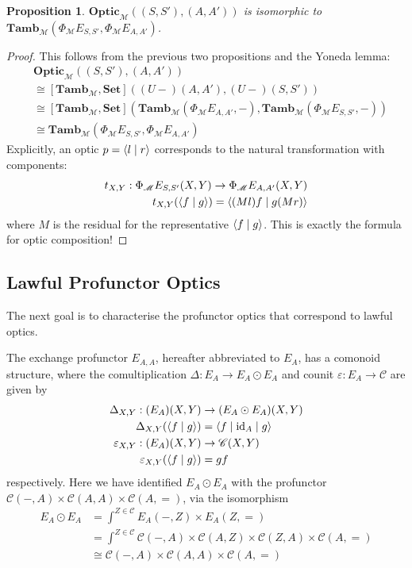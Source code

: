 \documentclass[11pt,letterpaper]{article}
\theoremstyle{plain}
\newtheorem{proposition}[theorem]{Proposition}
\theoremstyle{definition}
\newcommand{\C}{\mathscr{C}}
\newcommand{\M}{\mathscr{M}}
\newcommand{\Pastro}{\Phi}
\newcommand{\Set}{\mathbf{Set}}
\newcommand{\Tamb}{\mathbf{Tamb}}
\newcommand{\Optic}{\mathbf{Optic}}
\newcommand{\id}{\mathrm{id}}
\newcommand{\rep}[2]{{\ensuremath \left\langle #1 \mid #2 \right\rangle}}
\newcommand{\repthree}[3]{{\ensuremath \langle #1 \mid #2 \mid #3 \rangle}}
\begin{document}
\begin{proposition}
  $\Optic_\M((S, S'), (A, A'))$ is isomorphic to $\Tamb_\M(\Pastro_\M E_{S, S'}, \Pastro_\M E_{A, A'})$.
\end{proposition}
\begin{proof}
This follows from the previous two propositions and the Yoneda lemma:
\begin{align*}
  &\Optic_\M((S, S'), (A, A')) \\
  &\cong [\Tamb_\M, \Set]((U-)(A,A'),(U-)(S,S')) \\
  &\cong [\Tamb_\M, \Set](\Tamb_\M(\Pastro_\M E_{A, A'}, -),\Tamb_\M(\Pastro_\M E_{S, S'}, -)) \\
    &\cong \Tamb_\M(\Pastro_\M E_{S, S'}, \Pastro_\M E_{A, A'})
\end{align*}
Explicitly, an optic $p = \rep{l}{r}$ corresponds to the natural transformation with components:
\begin{align*}
t_{X, Y} : \Pastro_\M E_{S, S'}(X, Y) \to \Pastro_\M E_{A, A'}(X, Y) \\
t_{X, Y}(\rep{f}{g}) = \rep{(Ml)f}{g(Mr)}
\end{align*}
where $M$ is the residual for the representative $\rep{f}{g}$.
This is exactly the formula for optic composition!
\end{proof}

\subsection{Lawful Profunctor Optics}

The next goal is to characterise the profunctor optics that correspond to lawful optics.

The exchange profunctor $E_{A, A}$, hereafter abbreviated to $E_A$, has a comonoid structure, where the comultiplication $\Delta : E_A \to E_A \odot E_A$ and counit $\varepsilon : E_A \to \C$ are given by
\begin{align*}
  \Delta_{X, Y} : (E_A)(X, Y) &\to (E_A \odot E_A)(X, Y) \\
  \Delta_{X, Y}(\rep{f}{g}) &= \repthree{f}{\id_A}{g}  \\
  \varepsilon_{X, Y} : (E_A)(X, Y) &\to \C(X, Y) \\
  \varepsilon_{X, Y}(\rep{f}{g}) &= gf
\end{align*}
respectively. Here we have identified $E_A \odot E_A$ with the profunctor $\C(-, A) \times \C(A, A) \times \C(A, =)$, via the isomorphism
\begin{align*}
E_A \odot E_A 
&= \int^{Z \in \C} E_A(-, Z) \times E_A(Z, =) \\
&= \int^{Z \in \C} \C(-, A) \times \C(A, Z) \times \C(Z, A) \times \C(A, =) \\
&\cong \C(-, A) \times \C(A, A) \times \C(A, =) 
\end{align*}
\end{document}
